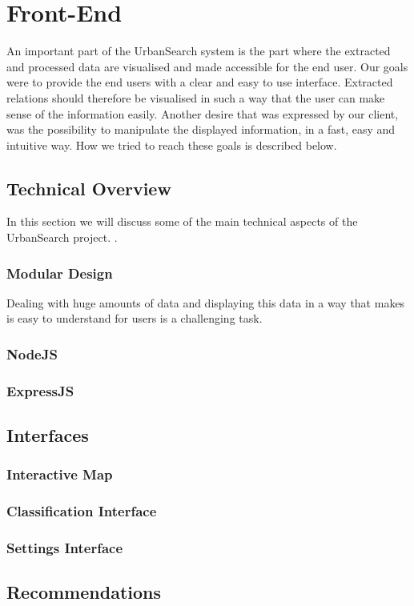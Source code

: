 \section{Front-End}
An important part of the UrbanSearch system is the part where the extracted and processed data are visualised and made accessible for the end user. Our goals were to provide the end users with a clear and easy to use interface. Extracted relations should therefore be visualised in such a way that the user can make sense of the information easily. Another desire that was expressed by our client, was the possibility to manipulate the displayed information, in a fast, easy and intuitive way. How we tried to reach these goals is described below.

\subsection{Technical Overview}
In this section we will discuss some of the main technical aspects of the UrbanSearch project. .

\subsubsection{Modular Design}
Dealing with huge amounts of data and displaying this data in a way that makes is easy to understand for users is a challenging task. 
\subsubsection{NodeJS}
\subsubsection{ExpressJS}


\subsection{Interfaces}
\subsubsection{Interactive Map}
\subsubsection{Classification Interface}
\subsubsection{Settings Interface}

\subsection{Recommendations}